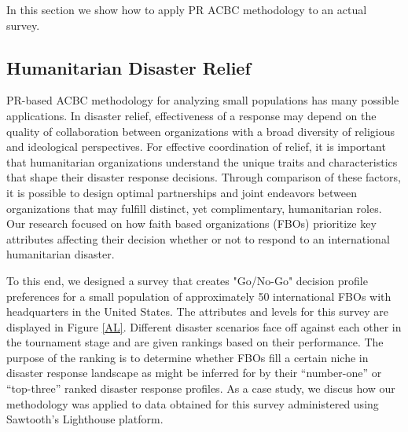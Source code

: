 \documentclass[a4paper, 12pt]{article}
\begin{document}
In this section we show how to apply PR ACBC methodology to an actual survey.

\subsection{Humanitarian Disaster Relief}

PR-based ACBC methodology for analyzing small populations has many possible applications. In disaster relief, effectiveness of a response may depend on the quality of collaboration between organizations with a broad diversity of religious and ideological perspectives. For effective coordination of relief, it is important that humanitarian organizations understand the unique traits and characteristics that shape their disaster response decisions. Through comparison of these factors, it is possible to design optimal partnerships and joint endeavors between organizations that may fulfill distinct, yet complimentary, humanitarian roles. Our research focused on how faith based organizations (FBOs) prioritize key attributes affecting their decision whether or not to respond to an international humanitarian disaster.

To this end, we designed a survey that creates "Go/No-Go" decision profile preferences for a small population of approximately 50 international FBOs with headquarters in the United States. The attributes and levels for this survey are displayed in Figure \ref{AL}. Different disaster scenarios face off against each other in the tournament stage and are given rankings based on their performance. The purpose of the ranking is to determine whether FBOs fill a certain niche in disaster response landscape as might be inferred for by their ``number-one'' or ``top-three'' ranked disaster response profiles. As a case study, we discus how our methodology was applied to data obtained for this survey administered using Sawtooth's Lighthouse platform.
\end{document}
